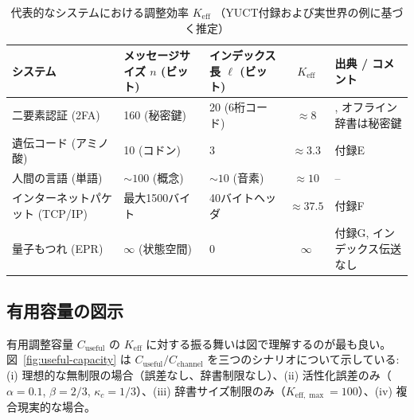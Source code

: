 \documentclass[12pt,a4paper]{article}
\theoremstyle{definition}
\theoremstyle{remark}
\newcommand{\Keff}{K_{\mathrm{eff}}}
\newcommand{\Keffmax}{K_{\mathrm{eff},\max}}
\begin{document}
	\begin{table}[htbp]
		\centering
		\caption{代表的なシステムにおける調整効率 $\Keff$ （YUCT付録および実世界の例に基づく推定）}
		\label{tab:keff-examples}
		\footnotesize
		\begin{tabularx}{\textwidth}{XXXcX}
			\toprule
			システム & メッセージサイズ $n$ (ビット) & インデックス長 $\ell$ (ビット) & $\Keff$ & 出典 / コメント \\
			\midrule
			二要素認証 (2FA) & 160 (秘密鍵) & 20 (6桁コード) & $\approx 8$ & \cite{Yakushev2026b}, オフライン辞書は秘密鍵 \\
			遺伝コード (アミノ酸) & 10 (コドン) & 3 & $\approx 3.3$ & 付録E \\
			人間の言語 (単語) & $\sim 100$ (概念) & $\sim 10$ (音素) & $\approx 10$ & – \\
			インターネットパケット (TCP/IP) & 最大1500バイト & 40バイトヘッダ & $\approx 37.5$ & 付録F \\
			量子もつれ (EPR) & $\infty$ (状態空間) & 0 & $\infty$ & 付録G, インデックス伝送なし \\
			\bottomrule
		\end{tabularx}
	\end{table}
	
	\subsection{有用容量の図示}
	\label{sec:graphical}
	
	有用調整容量 $C_{\text{useful}}$ の $\Keff$ に対する振る舞いは図で理解するのが最も良い。図~\ref{fig:useful-capacity} は $C_{\text{useful}}/C_{\text{channel}}$ を三つのシナリオについて示している: (i) 理想的な無制限の場合（誤差なし、辞書制限なし）、(ii) 活性化誤差のみ（$\alpha=0.1$, $\beta=2/3$, $\kappa_c=1/3$）、(iii) 辞書サイズ制限のみ（$\Keffmax=100$）、(iv) 複合現実的な場合。
	
\end{document}
